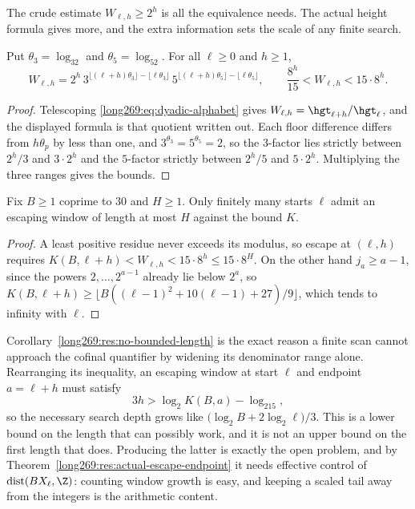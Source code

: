 The crude estimate $W_{\ell,h}\ge2^{h}$ is all the equivalence needs.  The
actual height formula gives more, and the extra information sets the scale of
any finite search.

\begin{proposition}\label{long269:res:window-growth}
Put $\theta_3=\log_32$ and $\theta_5=\log_52$.  For all $\ell\ge0$ and
$h\ge1$,
\[
 W_{\ell,h}=2^{h}\,
 3^{\lfloor(\ell+h)\theta_3\rfloor-\lfloor\ell\theta_3\rfloor}\,
 5^{\lfloor(\ell+h)\theta_5\rfloor-\lfloor\ell\theta_5\rfloor},
 \qquad
 \frac{8^{h}}{15}<W_{\ell,h}<15\cdot8^{h} .
\]
\end{proposition}

\begin{proof}
Telescoping \eqref{long269:eq:dyadic-alphabet} gives
$W_{\ell,h}=\hgt_{\ell+h}/\hgt_\ell$, and the displayed formula is that
quotient written out.  Each floor difference differs from $h\theta_p$ by less
than one, and $3^{\theta_3}=5^{\theta_5}=2$, so the $3$-factor lies strictly
between $2^{h}/3$ and $3\cdot2^{h}$ and the $5$-factor strictly between
$2^{h}/5$ and $5\cdot2^{h}$.  Multiplying the three ranges gives the bounds.
\end{proof}

\begin{corollary}\label{long269:res:no-bounded-length}
Fix $B\ge1$ coprime to $30$ and $H\ge1$.  Only finitely many starts $\ell$
admit an escaping window of length at most $H$ against the bound $K$.
\end{corollary}

\begin{proof}
A least positive residue never exceeds its modulus, so escape at $(\ell,h)$
requires $K(B,\ell+h)<W_{\ell,h}<15\cdot8^{h}\le15\cdot8^{H}$.  On the other
hand $j_a\ge a-1$, since the powers $2,\ldots,2^{a-1}$ already lie below
$2^{a}$, so $K(B,\ell+h)\ge\lfloor B((\ell-1)^{2}+10(\ell-1)+27)/9\rfloor$,
which tends to infinity with $\ell$.
\end{proof}

\noindent Corollary~\ref{long269:res:no-bounded-length} is the exact reason a finite
scan cannot approach the cofinal quantifier by widening its denominator range
alone.  Rearranging its inequality, an escaping window at start $\ell$ and
endpoint $a=\ell+h$ must satisfy
\[
 3h>\log_2K(B,a)-\log_215,
\]
so the necessary search depth grows like
$\bigl(\log_2B+2\log_2\ell\bigr)/3$.  This is a lower bound on the length that can
possibly work, and it is not an upper bound on the first length that does.
Producing the latter is exactly the open problem, and by
Theorem~\ref{long269:res:actual-escape-endpoint} it needs effective control of
$\operatorname{dist}(BX_\ell,\Z)$: counting window growth is easy, and keeping
a scaled tail away from the integers is the arithmetic content.

